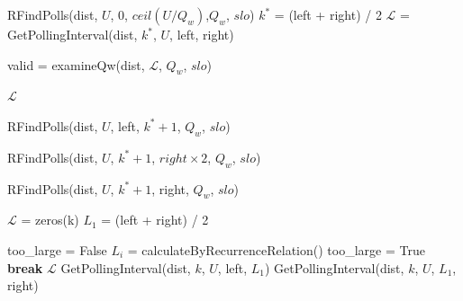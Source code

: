 \begin{algorithm}[t!]
    \caption{\bf Adaptive Polling Algorithm}
    \label{rasc:algo:adaptive-polling-algorithm}
    \footnotesize
    \begin{algorithmic}[1]
            \State \Return RFindPolls(dist, $U$, 0, $ceil(U/Q_w)$,$Q_w$, $slo$)
        \EndProcedure
         \label{rasc:algo:rfindpolls:start}
            \State $k^*$ = (left + right) / 2
            \State $\mathcal{L}$ = GetPollingInterval(dist, $k^*$, $U$, left, right)

            \State valid = examineQw(dist, $\mathcal{L}$, $Q_w$, $slo$) \label{rasc:algo:examine-qw}

                \State \Return $\mathcal{L}$
            \EndIf

                \State \Return RFindPolls(dist, $U$, left, $k^*+1$, $Q_w$, $slo$)
            \EndIf

                \State \Return RFindPolls(dist, $U$, $k^*+1$, $right\times2$, $Q_w$, $slo$)
            \EndIf

            \State \Return RFindPolls(dist, $U$, $k^*+1$, right, $Q_w$, $slo$)
            
        \EndProcedure \label{rasc:algo:rfindpolls:end}
            \State $\mathcal{L}$ = zeros(k)
            \State $L_1$ = (left + right) / 2 \label{rasc:algo:L1-init}

            \State too\_large = False
             \label{rasc:algo:Li-recurrence:start}
                \State $L_i$ = calculateByRecurrenceRelation()
                    \State too\_large = True
                    \State \textbf{break}
                \EndIf 
            \EndFor \label{rasc:algo:Li-recurrence:end}
                \State \Return $\mathcal{L}$
            \EndIf
                \State \Return GetPollingInterval(dist, $k$, $U$, left, $L_1$)
            \EndIf
            \State \Return GetPollingInterval(dist, $k$, $U$, $L_1$, right)
        \EndProcedure
    \end{algorithmic}
\end{algorithm}

